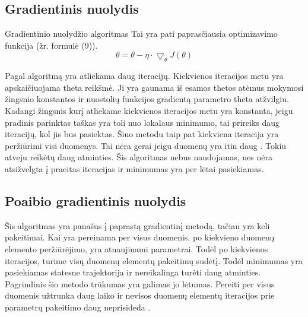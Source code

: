 \documentclass{VUMIFInfKursinis}
\begin{document}
\subsection{Gradientinis nuolydis}
Gradientinio nuolydžio algoritmas
Tai yra pati paprasčiausia optimizavimo funkcija  (žr. formulė (9)).
\begin{equation}
\theta = \theta - \eta \cdot \bigtriangledown_{\theta}J(\theta)
\end{equation}
\par
Pagal algoritmą yra atliekama daug iteracijų. Kiekvienos iteracijos metu yra
apskaičiuojama theta reikšmė. Ji yra gaunama iš esamos thetos atėmus mokymosi žingsnio konstantos
ir nuostolių funkcijos gradientą parametro theta atžvilgiu. Kadangi žingsnis kurį
atliekame kiekvienos iteracijos metu yra konstanta, jeigu pradinis parinktas taškas
yra toli nuo lokalaus minimumo, tai prireiks daug iteracijų, kol jis bus pasiektas.
Šiuo metodu taip pat kiekviena iteracija yra peržiūrimi visi duomenys. Tai nėra 
gerai jeigu duomenų yra itin daug \cite{salt8}. Tokiu atveju reikėtų daug atminties. Šis algoritmas nebus naudojamas, nes nėra
atsižvelgta į praeitas iteracijas ir minimumas yra per lėtai pasiekiamas.

\subsection{Poaibio gradientinis nuolydis}
 Šis algoritmas yra panašus į paprastą gradientinį metodą, tačiau yra keli pakeitimai.
 Kai yra pereinama per visus duomenis, po kiekvieno duomenų elemento peržiūrėjimo,
 yra atnaujinami parametrai. Todėl po kiekvienos iteracijos, turime visų duomenų
 elementų pakeitimų sudėtį. Todėl minimumas yra pasiekiamas statesne trajektorija ir
 nereikalinga turėti daug atminties. Pagrindinis šio metodo trūkumas yra galimas jo
 lėtumas. Pereiti per visus duomenis užtrunka daug laiko ir nevisos duomenų elementų
 iteracijos prie parametrų pakeitimo daug neprisideda \cite{salt9}.
\end{document}

